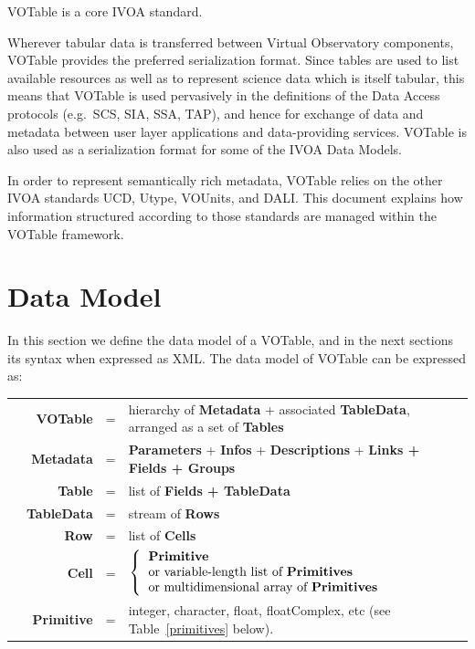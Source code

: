 \documentclass[11pt,a4paper]{ivoa}
\def\Tref#1{Table~\ref{#1}}
\let\fg=\color
\begin{document}
VOTable is a core IVOA standard.

Wherever tabular data is transferred between Virtual Observatory components,
VOTable provides the preferred serialization format.
Since tables are used to list available resources as well as to
represent science data which is itself tabular,
this means that VOTable is used pervasively in the definitions
of the Data Access protocols (e.g.\ SCS, SIA, SSA, TAP),
and hence for exchange of data and metadata
between user layer applications and data-providing services.
VOTable is also used as a serialization format for
some of the IVOA Data Models.

In order to represent semantically rich metadata, VOTable relies on
the other IVOA standards UCD, Utype, VOUnits, and DALI.
This document explains how information structured according to those
standards are managed within the VOTable framework.


\section{Data Model}

In this section we define the data model of a VOTable, and in the
next sections its syntax when expressed as XML. The data model of
VOTable can be expressed as:

\medskip
\begin{tabular}{rrcp{}}
\hspace{3em}&{\bf VOTable} &=& hierarchy of {\bf Metadata} + associated
        {\bf TableData}, arranged as a set of {\bf Tables}\\
&{\bf Metadata} &=& {\bf Parameters} + {\bf Infos} + {\bf Descriptions}
                + {\bf {\fg{black}Links + Fields + Groups}}\\
&{\bf Table} &=& list of {\bf Fields + TableData}\\
&{\bf TableData}{ } &=& stream of {\bf Rows}\\
&{\bf Row} &=& list of {\bf Cells}\\
&{\bf Cell} &=&
        $\left\{
        \begin{tabular}{l}
         {\bf Primitive} \\
        or variable-length list of {\bf Primitives} \\
        or multidimensional array of {\bf Primitives}\\
        \end{tabular}
        \right.$
        \\
&{\bf Primitive} &=& integer, character, float, floatComplex, etc
(see \Tref{primitives} below).
\end{tabular}
\end{document}
